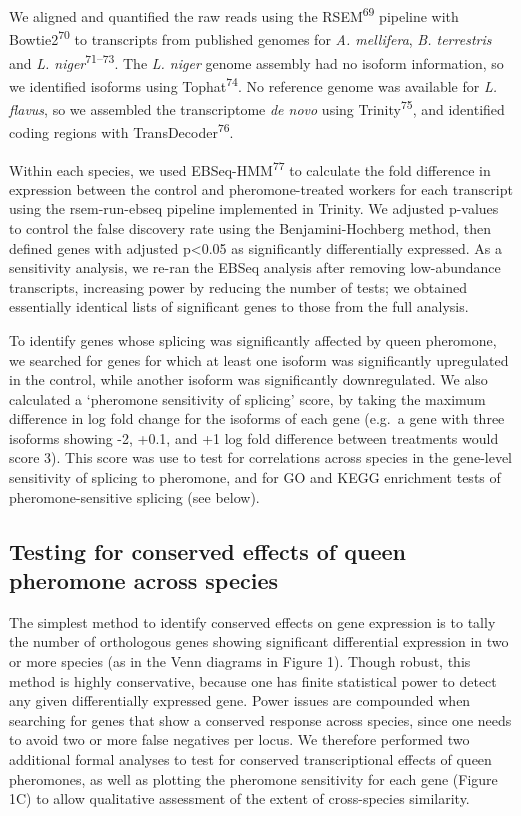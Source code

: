 \documentclass[12pt,]{article}
\begin{document}
We aligned and quantified the raw reads using the
RSEM\textsuperscript{69} pipeline with Bowtie2\textsuperscript{70} to
transcripts from published genomes for \emph{A. mellifera}, \emph{B.
terrestris} and \emph{L. niger}\textsuperscript{71--73}. The \emph{L.
niger} genome assembly had no isoform information, so we identified
isoforms using Tophat\textsuperscript{74}. No reference genome was
available for \emph{L. flavus}, so we assembled the transcriptome
\emph{de novo} using Trinity\textsuperscript{75}, and identified coding
regions with TransDecoder\textsuperscript{76}.

Within each species, we used EBSeq-HMM\textsuperscript{77} to calculate
the fold difference in expression between the control and
pheromone-treated workers for each transcript using the rsem-run-ebseq
pipeline implemented in Trinity. We adjusted p-values to control the
false discovery rate using the Benjamini-Hochberg method, then defined
genes with adjusted p\textless{}0.05 as significantly differentially
expressed. As a sensitivity analysis, we re-ran the EBSeq analysis after
removing low-abundance transcripts, increasing power by reducing the
number of tests; we obtained essentially identical lists of significant
genes to those from the full analysis.

To identify genes whose splicing was significantly affected by queen
pheromone, we searched for genes for which at least one isoform was
significantly upregulated in the control, while another isoform was
significantly downregulated. We also calculated a `pheromone sensitivity
of splicing' score, by taking the maximum difference in log fold change
for the isoforms of each gene (e.g.~a gene with three isoforms showing
-2, +0.1, and +1 log fold difference between treatments would score 3).
This score was use to test for correlations across species in the
gene-level sensitivity of splicing to pheromone, and for GO and KEGG
enrichment tests of pheromone-sensitive splicing (see below).

\subsection{Testing for conserved effects of queen pheromone across
species}\label{testing-for-conserved-effects-of-queen-pheromone-across-species}

The simplest method to identify conserved effects on gene expression is
to tally the number of orthologous genes showing significant
differential expression in two or more species (as in the Venn diagrams
in Figure 1). Though robust, this method is highly conservative, because
one has finite statistical power to detect any given differentially
expressed gene. Power issues are compounded when searching for genes
that show a conserved response across species, since one needs to avoid
two or more false negatives per locus. We therefore performed two
additional formal analyses to test for conserved transcriptional effects
of queen pheromones, as well as plotting the pheromone sensitivity for
each gene (Figure 1C) to allow qualitative assessment of the extent of
cross-species similarity.
\end{document}
